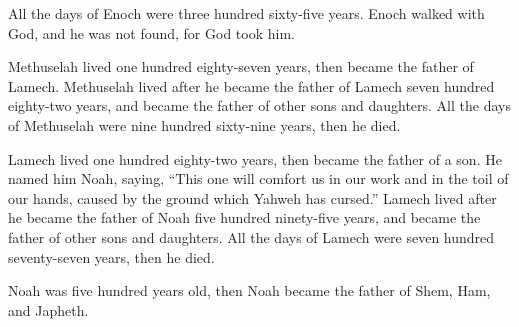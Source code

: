 {All the days of Enoch were three hundred sixty-five years.
Enoch walked with God, and he was not found, for God took him.
\par }{\PP {}Methuselah lived one hundred eighty-seven years, then became the father of Lamech.
Methuselah lived after he became the father of Lamech seven hundred eighty-two years, and became the father of other sons and daughters.
All the days of Methuselah were nine hundred sixty-nine years, then he died.
\par }{\PP {}Lamech lived one hundred eighty-two years, then became the father of a son.
He named him Noah, saying, “This one will comfort us in our work and in the toil of our hands, caused by the ground which Yahweh has cursed.”
Lamech lived after he became the father of Noah five hundred ninety-five years, and became the father of other sons and daughters.
All the days of Lamech were seven hundred seventy-seven years, then he died.
\par }{\PP {}Noah was five hundred years old, then Noah became the father of Shem, Ham, and Japheth.

}
